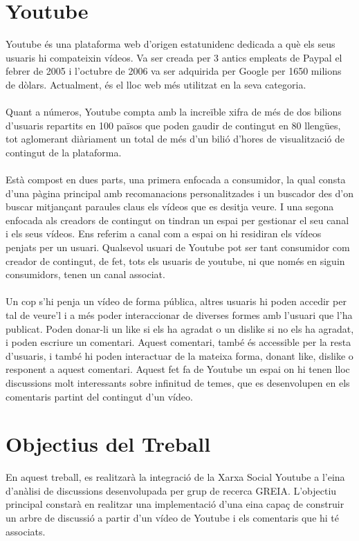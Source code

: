 \documentclass{article}
\begin{document}
	\section{Youtube}
	Youtube és una plataforma web d'origen estatunidenc dedicada a què els
	seus usuaris hi compateixin vídeos. Va ser creada per 3 antics empleats de Paypal
	el febrer de 2005 i l'octubre de 2006 va ser adquirida per Google per 1650
	milions de dòlars. Actualment, és el lloc web més utilitzat en la seva categoria.\\\\
	Quant a números, Youtube compta amb la increïble
	xifra de més de dos bilions d'usuaris repartits en 100 països
	que poden gaudir de contingut en 80 llengües, tot aglomerant diàriament
	un total de més d'un bilió d'hores de visualització de contingut
	de la plataforma.\\\\
	Està compost en dues parts, una primera enfocada a consumidor, la qual consta
	d'una pàgina principal amb recomanacions personalitzades i un buscador
	des d'on buscar mitjançant paraules claus els vídeos que es desitja veure.
	I una segona enfocada als creadors de contingut on tindran un espai per
	gestionar el seu canal i els seus vídeos. Ens referim a canal com a espai on
	hi residiran els vídeos penjats per un usuari. Qualsevol usuari de Youtube
	pot ser tant consumidor com creador de contingut,
	de fet, tots els usuaris de youtube, ni que només en siguin consumidors,
	tenen un canal associat.\\\\
	Un cop s'hi penja un vídeo de forma pública, altres usuaris hi poden accedir
	per tal de veure'l i a més poder interaccionar de diverses formes amb l'usuari
	que l'ha publicat. Poden donar-li un like si els ha agradat o un dislike si
	no els ha agradat, i poden escriure un comentari. Aquest comentari, també
	és accessible per la resta d'usuaris, i també hi poden interactuar de la mateixa
	forma, donant like, dislike o responent a aquest comentari.
	Aquest fet fa de Youtube un espai on hi tenen lloc discussions molt interessants
	sobre infinitud de temes, que es desenvolupen en els comentaris
	partint del contingut d'un vídeo.
	\section{Objectius del Treball}
	En aquest treball, es realitzarà la integració de la Xarxa Social Youtube
	a l'eina d'anàlisi de discussions desenvolupada per grup de recerca GREIA.
	L'objectiu principal constarà en realitzar una implementació d'una eina
	capaç de construir un arbre de discussió a partir d'un vídeo de Youtube i els
	comentaris que hi té associats.
\end{document}
